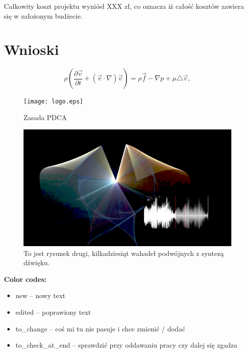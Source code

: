 \documentclass[a4paper,12pt,reqno]{article}
\begin{document}
Całkowity koszt projektu wyniósł \textcolor{to_check_at_end}{XXX} zł, co oznacza iż całość kosztów zawiera się w założonym budżecie.

\newpage
\section{Wnioski} \label{section:wnioski}

\newpage





\newpage

\begin{equation} 
\rho\left(\frac{\partial\vec v}{\partial t}+(\vec v\cdot\nabla)\vec v\right) =\rho\vec f - \nabla p + \mu\triangle\vec v, \label{rownanie}
\end{equation} 

\begin{figure}[!ht]%
\centering
\texttt{[image: logo.eps]}
\caption{Zasada PDCA\label{PDCA}}
\qquad
\end{figure}   

\begin{figure}[!ht]%
\centering
\includegraphics[width=0.8\columnwidth]{pendulums.png}
\caption{To jest rysunek drugi, kilkadziesiąt wahadeł podwójnych z syntezą dźwięku.\label{wahadla}}%
%
\qquad
\end{figure} 

\bf{Color codes:}
\begin{itemize}
\item \textcolor{new}{new} – nowy text
\item \textcolor{edited}{edited} – poprawiony text
\item \textcolor{to_change}{to\_change} – coś mi tu nie pasuje i chce zmienić / dodać
\item \textcolor{to_check_at_end}{to\_check\_at\_end} – sprawdzić przy oddawaniu pracy czy dalej się zgadza
\end{itemize}
\end{document}
